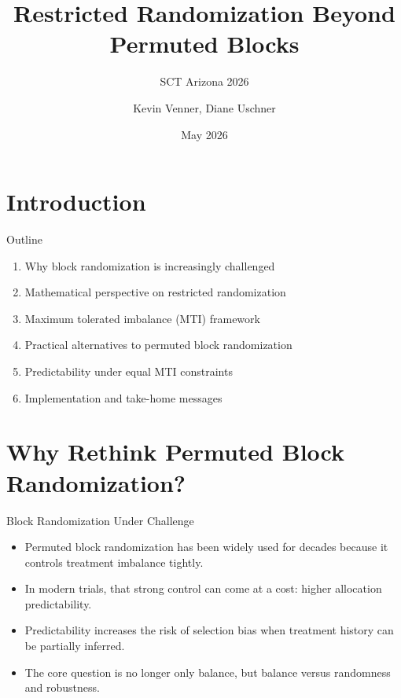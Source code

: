 \documentclass[
  11pt,
  ignorenonframetext,
  aspectratio=169,
]{beamer}
\title{Restricted Randomization Beyond Permuted Blocks}
\subtitle{SCT Arizona 2026}
\author{Kevin Venner, Diane Uschner}
\date{May 2026}
\providecommand{\tightlist}{%
  \setlength{\itemsep}{0pt}\setlength{\parskip}{0pt}}
\begin{document}
\frame{\titlepage}

\hypertarget{introduction}{%
\section{Introduction}\label{introduction}}

\begin{frame}{Outline}
\protect\hypertarget{outline}{}
\begin{enumerate}
\tightlist
\item
  Why block randomization is increasingly challenged
\item
  Mathematical perspective on restricted randomization
\item
  Maximum tolerated imbalance (MTI) framework
\item
  Practical alternatives to permuted block randomization
\item
  Predictability under equal MTI constraints
\item
  Implementation and take-home messages
\end{enumerate}
\end{frame}

\hypertarget{why-rethink-permuted-block-randomization}{%
\section{Why Rethink Permuted Block
Randomization?}\label{why-rethink-permuted-block-randomization}}

\begin{frame}{Block Randomization Under Challenge}
\protect\hypertarget{block-randomization-under-challenge}{}
\begin{itemize}
\tightlist
\item
  Permuted block randomization has been widely used for decades because
  it controls treatment imbalance tightly.
\item
  In modern trials, that strong control can come at a cost: higher
  allocation predictability.
\item
  Predictability increases the risk of selection bias when treatment
  history can be partially inferred.
\item
  The core question is no longer only balance, but balance versus
  randomness and robustness.
\end{itemize}
\end{frame}
\end{document}
